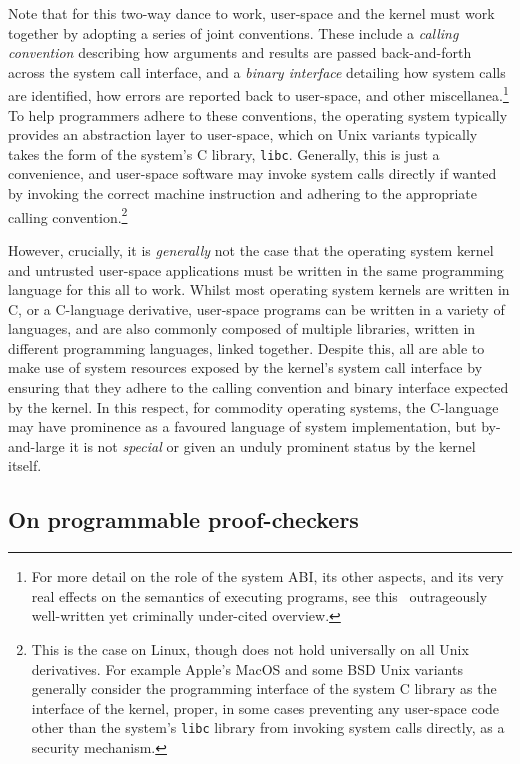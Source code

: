 \documentclass[a4paper, UKenglish, cleveref, autoref, thm-restate, colorlinks]{lipics-v2021}
\begin{document}
Note that for this two-way dance to work, user-space and the kernel must work together by adopting a series of joint conventions.
These include a \emph{calling convention} describing how arguments and results are passed back-and-forth across the system call interface, and a \emph{binary interface} detailing how system calls are identified, how errors are reported back to user-space, and other miscellanea.\footnote{For more detail on the role of the system ABI, its other aspects, and its very real effects on the semantics of executing programs, see this~\cite{DBLP:conf/oopsla/KellMS16} outrageously well-written yet criminally under-cited overview.}
To help programmers adhere to these conventions, the operating system typically provides an abstraction layer to user-space, which on Unix variants typically takes the form of the system's C library, \texttt{libc}.
Generally, this is just a convenience, and user-space software may invoke system calls directly if wanted by invoking the correct machine instruction and adhering to the appropriate calling convention.\footnote{This is the case on Linux, though does not hold universally on all Unix derivatives.  For example Apple's MacOS and some BSD Unix variants generally consider the programming interface of the system C library as the interface of the kernel, proper, in some cases preventing any user-space code other than the system's \texttt{libc} library from invoking system calls directly, as a security mechanism.}

However, crucially, it is \emph{generally} not the case that the operating system kernel and untrusted user-space applications must be written in the same programming language for this all to work.
Whilst most operating system kernels are written in C, or a C-language derivative, user-space programs can be written in a variety of languages, and are also commonly composed of multiple libraries, written in different programming languages, linked together.
Despite this, all are able to make use of system resources exposed by the kernel's system call interface by ensuring that they adhere to the calling convention and binary interface expected by the kernel.
In this respect, for commodity operating systems, the C-language may have prominence as a favoured language of system implementation, but by-and-large it is not \emph{special} or given an unduly prominent status by the kernel itself.

\subsection{On programmable proof-checkers}
\end{document}
